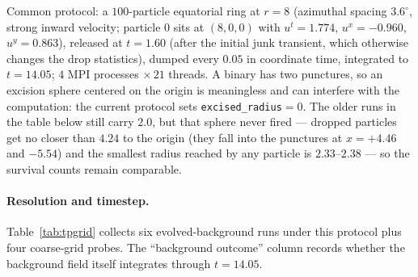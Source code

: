 \documentclass[11pt]{article}
\begin{document}
Common protocol: a $100$-particle equatorial ring at $r = 8$ (azimuthal spacing
$3.6^\circ$, strong inward velocity; particle 0 sits at $(8,0,0)$ with
$u^t = 1.774$, $u^x = -0.960$, $u^y = 0.863$), released at $t = 1.60$ (after the
initial junk transient, which otherwise changes the drop statistics), dumped
every $0.05$ in coordinate time, integrated to $t = 14.05$; $4$ MPI processes
$\times\,21$ threads.  A binary has two punctures, so an excision sphere
centered on the origin is meaningless and can interfere with the computation: the
current protocol sets \texttt{excised\_radius}$ = 0$.  The older runs in the
table below still carry $2.0$, but that sphere never fired --- dropped particles
get no closer than $4.24$ to the origin (they fall into the punctures at
$x = +4.46$ and $-5.54$) and the smallest radius reached by any particle is
$2.33$--$2.38$ --- so the survival counts remain comparable.

\paragraph{Resolution and timestep.}
Table~\ref{tab:tpgrid} collects six evolved-background runs under this protocol
plus four coarse-grid probes.  The ``background outcome'' column records whether
the background field itself integrates through $t = 14.05$.
\end{document}
